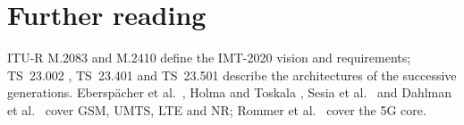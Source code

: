 \documentclass[11pt,a4paper]{article}
\begin{document}
\section{Further reading}
ITU-R M.2083 \cite{itu2015m2083} and M.2410 \cite{itu2017m2410} define the IMT-2020 vision and requirements; TS~23.002 \cite{ts23002}, TS~23.401
\cite{ts23401} and TS~23.501 \cite{ts23501} describe the architectures of the successive generations. Eberspächer et al.\ \cite{eberspaecher2009gsm},
Holma and Toskala \cite{holma2010wcdma}, Sesia et al.\ \cite{sesia2011lte} and Dahlman et al.\ \cite{dahlman2020nr} cover GSM, UMTS, LTE and NR;
Rommer et al.\ \cite{rommer2020core} cover the 5G core.

\printbibliography[heading=subbibliography,title={\ACNstrRefs}]
\end{document}
